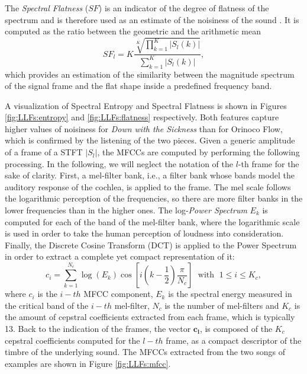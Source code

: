 The \textit{Spectral Flatness} ($SF$) is an indicator of the degree of flatness of the spectrum and is therefore used as an estimate of the noisiness of the sound \cite{Rottondi2015}. It is computed as the ratio between the geometric and the arithmetic mean
\begin{equation}
SF_l = K \frac{\sqrt[K]{\prod\limits_{k=1}^{K}|S_l(k)|}}{\sum\limits_{k=1}^{K}|S_l(k)|},
\end{equation}
which provides an estimation of the similarity between the magnitude spectrum of the signal frame and the flat shape inside a predefined frequency band. 


A visualization of Spectral Entropy and Spectral Flatness is shown in Figures \ref{fig:LLFs:entropy} and \ref{fig:LLFs:flatness} respectively. Both features capture higher values of noisiness for \textit{Down with the Sickness} than for Orinoco Flow, which is confirmed by the listening of the two pieces.
 Given a generic amplitude of a frame of a STFT $|S_l|$, the MFCCs are computed by performing the following processing. In the following, we will neglect the notation of the $l$-th frame for the sake of clarity. First, a mel-filter bank, i.e., a filter bank whose bands model the auditory response of the cochlea, is applied to the frame. The mel scale follows the logarithmic perception of the frequencies, so there are more filter banks in the lower frequencies than in the higher ones. The log-\textit{Power Spectrum} $E_k$ is computed for each of the band of the mel-filter bank, where the logarithmic scale is used in order to take the human perception of loudness into consideration. Finally, the Discrete Cosine Transform (DCT) is applied to the Power Spectrum in order to extract a complete yet compact representation of it:
\begin{equation}
c_i = \sum_{k=1}^{N_c}  \log(E_k) \cos \left[i \left(k-\frac{1}{2}\right) \frac{\pi}{N_c} \right]  \;\text{ with }\; 1\leq i\leq K_c, 
\end{equation}
where $c_i$ is the $i-th$ MFCC component, $E_k$ is the spectral energy measured in the critical band of the $i-th$ mel-filter, $N_c$ is the number of mel-filters and $K_c$ is the amount of cepstral coefficients extracted from each frame, which is typically 13. Back to the indication of the frames, the vector $\mathbf{c_l}$, is composed of the $K_c$ cepstral coefficients computed for the $l-th$ frame, as a compact descriptor of the timbre of the underlying sound. The MFCCs extracted from the two songs of examples are shown in Figure \ref{fig:LLFs:mfcc}. 


